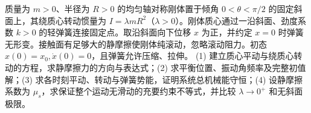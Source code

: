 质量为 \(m>0\)、半径为 \(R>0\) 的均匀轴对称刚体置于倾角 \(0<\theta<\pi/2\) 的固定斜面上，其绕质心转动惯量为 \(I=\lambda mR^2\)（\(\lambda>0\)）。刚体质心通过一沿斜面、劲度系数 \(k>0\) 的轻弹簧连接固定点。取沿斜面向下位移 \(x\) 为正，并约定 \(x=0\) 时弹簧无形变。接触面有足够大的静摩擦使刚体纯滚动，忽略滚动阻力。初态 \(x(0)=x_0,\dot x(0)=0\)，且弹簧允许压缩、拉伸。
(1) 建立质心平动与绕质心转动的方程，求静摩擦力的方向与表达式；(2) 求平衡位置、振动角频率及完整初值解；(3) 求各时刻平动、转动与弹簧势能，证明系统总机械能守恒；(4) 设静摩擦系数为 \(\mu_s\)，求保证整个运动无滑动的充要约束不等式，并比较 \(\lambda\to0^+\) 和无斜面极限。
